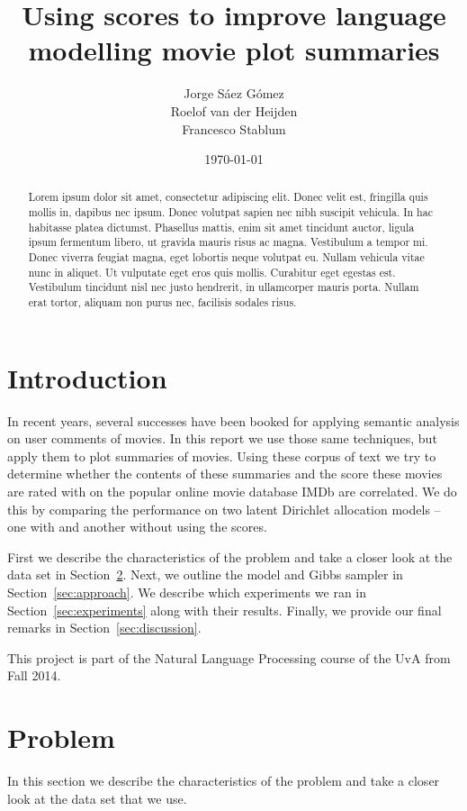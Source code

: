 \documentclass[a4paper,10pt]{article}
\title{Using scores to improve language modelling movie plot summaries}
\author{Jorge S\'{a}ez G\'{o}mez\\
Roelof van der Heijden\\
Francesco Stablum
}
\date{\today}
\begin{document}
\maketitle
\begin{abstract}
  Lorem ipsum dolor sit amet, consectetur adipiscing elit. Donec velit est, fringilla quis mollis in, dapibus nec ipsum. Donec volutpat sapien nec nibh suscipit vehicula. In hac habitasse platea dictumst. Phasellus mattis, enim sit amet tincidunt auctor, ligula ipsum fermentum libero, ut gravida mauris risus ac magna. Vestibulum a tempor mi. Donec viverra feugiat magna, eget lobortis neque volutpat eu. Nullam vehicula vitae nunc in aliquet. Ut vulputate eget eros quis mollis. Curabitur eget egestas est. Vestibulum tincidunt nisl nec justo hendrerit, in ullamcorper mauris porta. Nullam erat tortor, aliquam non purus nec, facilisis sodales risus.
\end{abstract}

\section{Introduction} 
In recent years, several successes have been booked for applying semantic analysis on user comments of movies\cite{MovieRegression, PredictStars}.
In this report we use those same techniques, but apply them to plot summaries of movies.
Using these corpus of text we try to determine whether the contents of these summaries and the score these movies are rated with on the popular online movie database IMDb \cite{IMDb} are correlated.
We do this by comparing the performance on two latent Dirichlet allocation models -- one with and another without using the scores.

First we describe the characteristics of the problem and take a closer look at the data set in Section~\ref{sec:problem}.
Next, we outline the model and Gibbs sampler in Section~\ref{sec:approach}.
We describe which experiments we ran in Section~\ref{sec:experiments} along with their results.
Finally, we provide our final remarks in Section~\ref{sec:discussion}.

This project is part of the Natural Language Processing course of the UvA from Fall 2014.

\section{Problem}
\label{sec:problem}
In this section we describe the characteristics of the problem and take a closer look at the data set that we use.
\end{document}
